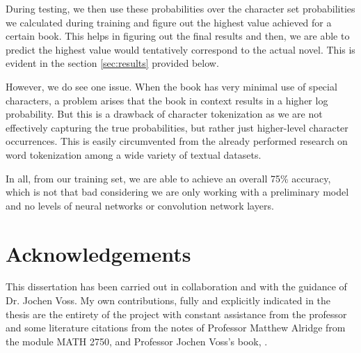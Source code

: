 \documentclass[11pt,a4paper,twoside,openright]{report}
\begin{document}
During testing, we then use these probabilities over the character set probabilities we calculated during training and figure out the highest value achieved for a certain book. This helps in figuring out the final results and then, we are able to predict the highest value would tentatively correspond to the actual novel. This is evident in the section \ref{sec:results} provided below.

However, we do see one issue. When the book has very minimal use of special characters, a problem arises that the book in context results in a higher log probability. But this is a drawback of character tokenization as we are not effectively capturing the true probabilities, but rather just higher-level character occurrences. This is easily circumvented from the already performed research on word tokenization among a wide variety of textual datasets. 

In all, from our training set, we are able to achieve an overall 75\% accuracy, which is not that bad considering we are only working with a preliminary model and no levels of neural networks or convolution network layers. 

\chapter*{Acknowledgements}
This dissertation has been carried out in collaboration and with the guidance of Dr. Jochen Voss. My own contributions, fully and explicitly indicated in the thesis are the entirety of the project with constant assistance from the professor and some literature citations from the notes of Professor Matthew Alridge from the module MATH 2750, \textcite{MATH-2750} and Professor Jochen Voss's book, \textcite{voss:2013}. 


\tableofcontents
\listoffigures
\listoftables

\newpage
\setcounter{page}{0}








\renewcommand\bibname{References}
\printbibliography


\end{document}
